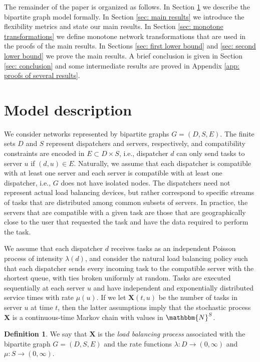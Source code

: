 \documentclass[a4paper, 12pt]{article}
\theoremstyle{definition}
\newtheorem{definition}{Definition}
\newcommand{\map}[3]{#1 : #2 \longrightarrow #3}
\newcommand{\bX}{\boldsymbol{X}}
\newcommand{\N}{\mathbbm{N}}
\begin{document}
The remainder of the paper is organized as follows. In Section \ref{sec: model description} we describe the bipartite graph model formally. In Section \ref{sec: main results} we introduce the flexibility metrics and  state our main results. In Section \ref{sec: monotone transformations} we define monotone network transformations  that are used in the proofs of the main results. In Sections \ref{sec: first lower bound} and \ref{sec: second lower bound} we prove the main results. A brief conclusion is given in Section \ref{sec: conclusion} and some intermediate results are proved in Appendix \ref{app: proofs of several results}.

\section{Model description}
\label{sec: model description}

We consider networks represented by bipartite graphs $G = (D, S, E)$. The finite sets $D$ and $S$ represent dispatchers and servers, respectively, and compatibility constraints are encoded in $E \subset D \times S$, i.e., dispatcher $d$ can only send tasks to server $u$ if $(d, u) \in E$. Naturally, we assume that each dispatcher is compatible with at least one server and each server is compatible with at least one dispatcher, i.e., $G$ does not have isolated nodes. The dispatchers need not represent actual load balancing devices, but rather correspond to specific streams of tasks that are distributed among common subsets of servers. In practice, the servers that are compatible with a given task are those that are geographically close to the user that requested the task and have the data required to perform the task.

We assume that each dispatcher $d$ receives tasks as an independent Poisson process of intensity $\lambda(d)$, and consider the natural load balancing policy such that each dispatcher sends every incoming task to the compatible server with the shortest queue, with ties broken uniformly at random. Tasks are executed sequentially at each server $u$ and have independent and exponentially distributed service times with rate $\mu(u)$. If we let $\bX(t, u)$ be the number of tasks in server $u$ at time $t$, then the latter assumptions imply that the stochastic process $\bX$ is a continuous-time Markov chain with values in $\N^S$.

\begin{definition}
	\label{def: load balancing process}
	We say that $\bX$ is the \emph{load balancing process} associated with the bipartite graph $G = (D, S, E)$ and the rate functions $\map{\lambda}{D}{(0, \infty)}$ and $\map{\mu}{S}{(0, \infty)}$.
\end{definition}
\end{document}
